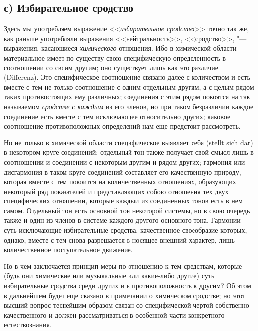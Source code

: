 \subsection[с) Избирательное сродство]{с) Избирательное сродство}

Здесь мы употребляем выражение <<{\em избирательное сродство}>> точно так же,
как раньше употребляли выражения <<нейтральность>>, <<сродство>>, "---
выражения, касающиеся {\em химического} отношения. Ибо в химической области
материальное имеет по существу свою специфическую определенность в соотношении
со своим другим; оно существует лишь как это различие (Diffe\-renz). Это
специфическое соотношение связано далее с количеством и есть вместе с тем не
только соотношение с одним отдельным другим, а с целым рядом таких
противостоящих ему различных; соединения с этим рядом покоятся на так
называемом {\em сродстве с каждым} из его членов, но при таком безразличии
каждое соединение есть вместе с тем исключающее относительно других; каковое
соотношение противоположных определений нам еще предстоит рассмотреть.

Но не только в химической области специфическое выявляет себя (stellt sich dar)
в некотором круге соединений; отдельный тон также получает свой смысл лишь в
соотношении и соединении с некоторым другим и рядом других; гармония или
дисгармония в таком круге соединений составляет его качественную природу,
которая вместе с тем покоится на количественных отношениях, образующих
некоторый ряд показателей и представляющих собою отношения тех двух
специфических отношений, которые каждый из соединенных тонов есть в нем самом.
Отдельный тон есть основной тон некоторой системы, но в свою очередь также и
один из членов в системе каждого другого основного тона. Гармонии суть
исключающие избирательные сродства, качественное своеобразие которых, однако,
вместе с тем снова разрешается в носящее внешний характер, лишь количественное
поступательное движение.

Но в чем заключается принцип меры по отношению к тем средствам, которые (будь
они химические или музыкальные или какие-либо другие) суть избирательные
сродства среди других и в противоположность к другим? Об этом в дальнейшем
будет еще сказано в примечании о химическом сродстве; но этот высший вопрос
теснейшим образом связан со специфической чертой собственно качественного и
должен рассматриваться в особенной части конкретного естествознания.

